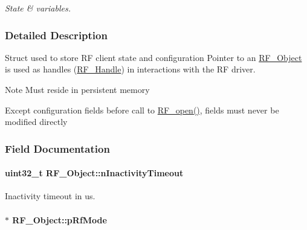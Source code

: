 \begin{DoxyCompactItemize}
\begin{tabbing}
\end{tabbing}\begin{DoxyCompactList}\small\item\em State \& variables. \end{DoxyCompactList}\end{DoxyCompactItemize}


\subsubsection{Detailed Description}
Struct used to store R\+F client state and configuration Pointer to an \hyperlink{struct_r_f___object}{R\+F\+\_\+\+Object} is used as handles (\hyperlink{_r_f_8h_a5e8ab7fc87fb818f435d9b6226ee573f}{R\+F\+\_\+\+Handle}) in interactions with the R\+F driver. 

\begin{DoxyNote}{Note}
Must reside in persistent memory 

Except configuration fields before call to \hyperlink{_r_f_8h_a13a7c6f5a2b797e0aac18fecfaba6f64}{R\+F\+\_\+open()}, fields must never be modified directly 
\end{DoxyNote}


\subsubsection{Field Documentation}
\paragraph[{n\+Inactivity\+Timeout}]{\setlength{\rightskip}{0pt plus 5cm}uint32\+\_\+t R\+F\+\_\+\+Object\+::n\+Inactivity\+Timeout}\label{struct_r_f___object_acab4c0d923181e985a2867b51f74edcc}


Inactivity timeout in us. 

\paragraph[{p\+Rf\+Mode}]{$\ast$ R\+F\+\_\+\+Object\+::p\+Rf\+Mode}\label{struct_r_f___object_a54a6ee0cde609ca67902a16f9279ca42}


